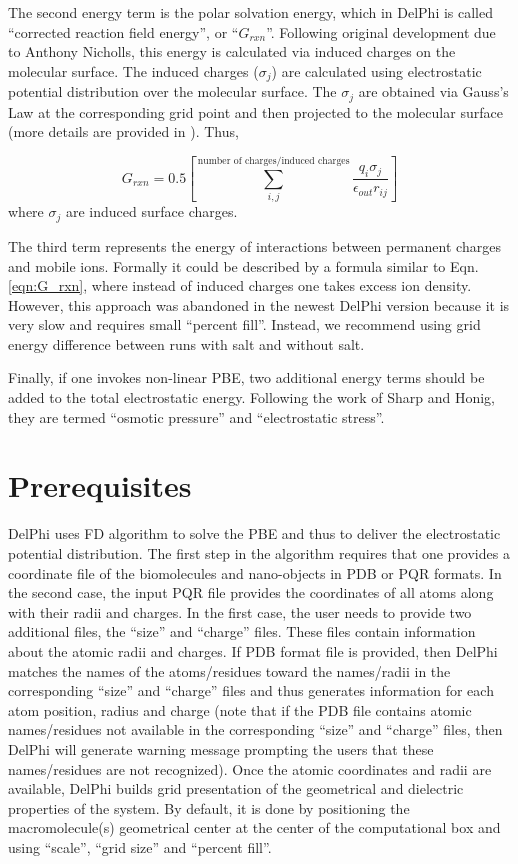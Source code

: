 \documentclass[9pt,tutorial]{livecoms}
\begin{document}
The second energy term is the polar solvation energy, which in DelPhi is called ``corrected reaction field energy'', or ``$ G_{rxn} $''. Following original development due to Anthony Nicholls, this energy is calculated via induced charges on the molecular surface. The induced charges ($ \sigma_j $) are calculated using electrostatic potential distribution over the molecular surface. The $ \sigma_j $ are obtained via Gauss's Law at the corresponding grid point and then projected to the molecular surface (more details are provided in \cite{rocchia2001extending}). Thus, 

\begin{equation}\label{eqn:G_rxn}
    G_{rxn} = 0.5 \left[ \sum_{i, j}^{\text{number of charges/induced charges}}{\frac{q_i \sigma_j}{\epsilon_{out}r_{ij}}} \right]
\end{equation}
where $ \sigma_j $ are induced surface charges. 

The third term represents the energy of interactions between permanent charges and mobile ions. Formally it could be described by a formula similar to Eqn. \ref{eqn:G_rxn}, where instead of induced charges one takes excess ion density. However, this approach was abandoned in the newest DelPhi version because it is very slow and requires small “percent fill”. Instead, we recommend using grid energy difference between runs with salt and without salt. 

Finally, if one invokes non-linear PBE, two additional energy terms should be added to the total electrostatic energy. Following the work of Sharp and Honig\cite{sharp1990electrostatic}, they are termed ``osmotic pressure'' and ``electrostatic stress''.


\section{Prerequisites}

DelPhi uses FD algorithm to solve the PBE and thus to deliver the electrostatic potential distribution. The first step in the algorithm requires that one provides a coordinate file of the biomolecules and nano-objects in PDB or PQR formats. In the second case, the input PQR file provides the coordinates of all atoms along with their radii and charges. In the first case, the user needs to provide two additional files, the ``size'' and ``charge'' files. These files contain information about the atomic radii and charges. If PDB format file is provided, then DelPhi matches the names of the atoms/residues toward the names/radii in the corresponding ``size'' and ``charge'' files and thus generates information for each atom position, radius and charge (note that if the PDB file contains atomic names/residues not available in the corresponding ``size'' and ``charge'' files, then DelPhi will generate warning message prompting the users that these names/residues are not recognized). Once the atomic coordinates and radii are available, DelPhi builds grid presentation of the geometrical and dielectric properties of the system. By default, it is done by positioning the macromolecule(s) geometrical center at the center of the computational box and using ``scale'', ``grid size'' and ``percent fill''. 
\end{document}
